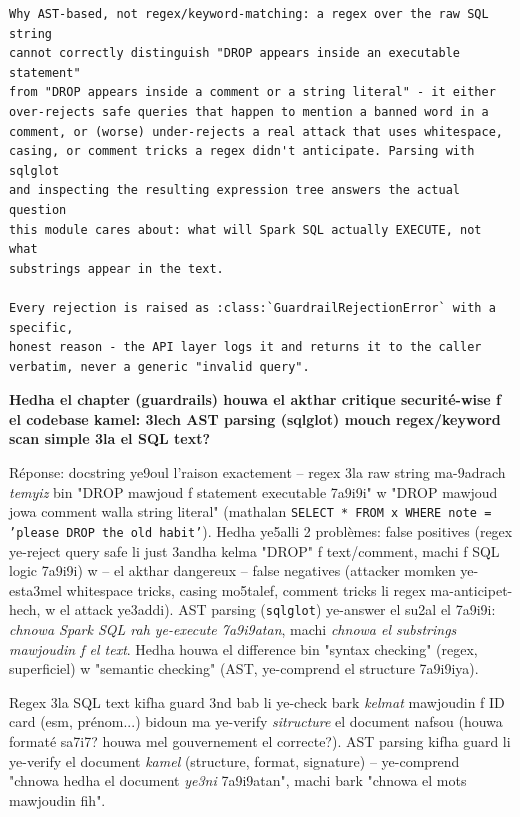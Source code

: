 \documentclass[11pt,a4paper]{report}
\DeclareRobustCommand{\code}[1]{\texttt{#1}}
\begin{document}
\begin{lstlisting}[style=pystyle]
Why AST-based, not regex/keyword-matching: a regex over the raw SQL string
cannot correctly distinguish "DROP appears inside an executable statement"
from "DROP appears inside a comment or a string literal" - it either
over-rejects safe queries that happen to mention a banned word in a
comment, or (worse) under-rejects a real attack that uses whitespace,
casing, or comment tricks a regex didn't anticipate. Parsing with sqlglot
and inspecting the resulting expression tree answers the actual question
this module cares about: what will Spark SQL actually EXECUTE, not what
substrings appear in the text.

Every rejection is raised as :class:`GuardrailRejectionError` with a specific,
honest reason - the API layer logs it and returns it to the caller
verbatim, never a generic "invalid query".
\end{lstlisting}

\begin{soual}
\textbf{Hedha el chapter (guardrails) houwa el akthar critique securité-wise
f el codebase kamel: 3lech AST parsing (sqlglot) mouch regex/keyword scan
simple 3la el SQL text?}

Réponse: docstring ye9oul l'raison exactement -- regex 3la raw string
ma-9adrach \emph{temyiz} bin "DROP mawjoud f statement executable 7a9i9i"
w "DROP mawjoud jowa comment walla string literal" (mathalan
\code{SELECT * FROM x WHERE note = 'please DROP the old habit'}). Hedha
ye5alli 2 problèmes: false positives (regex ye-reject query safe li just
3andha kelma "DROP" f text/comment, machi f SQL logic 7a9i9i) w -- el
akthar dangereux -- false negatives (attacker momken ye-esta3mel whitespace
tricks, casing mo5talef, comment tricks li regex ma-anticipet-hech, w el
attack ye3addi). AST parsing (\code{sqlglot}) ye-answer el su2al el 7a9i9i:
\emph{chnowa Spark SQL rah ye-execute 7a9i9atan}, machi \emph{chnowa el
substrings mawjoudin f el text}. Hedha houwa el difference bin "syntax
checking" (regex, superficiel) w "semantic checking" (AST, ye-comprend
el structure 7a9i9iya).
\end{soual}

\begin{analogy}
Regex 3la SQL text kifha guard 3nd bab li ye-check bark \emph{kelmat}
mawjoudin f ID card (esm, prénom...) bidoun ma ye-verify \emph{sitructure}
el document nafsou (houwa formaté sa7i7? houwa mel gouvernement el
correcte?). AST parsing kifha guard li ye-verify el document \emph{kamel}
(structure, format, signature) -- ye-comprend "chnowa hedha el document
\emph{ye3ni} 7a9i9atan", machi bark "chnowa el mots mawjoudin fih".
\end{analogy}
\end{document}
